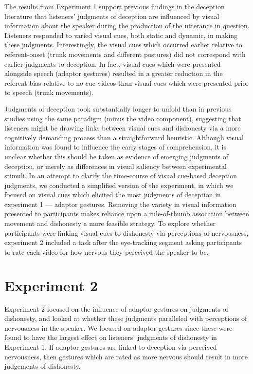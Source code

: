 \documentclass[a4paper,man,natbib]{apa6}
\begin{document}
The results from Experiment 1 support previous findings in the deception literature that listeners' judgments of deception are influenced by visual information about the speaker during the production of the utterance in question.
Listeners responded to varied visual cues, both static and dynamic, in making these judgments.
Interestingly, the visual cues which occurred earlier relative to referent-onset (trunk movements and different postures) did not correspond with earlier judgments to deception.
In fact, visual cues which were presented alongside speech (adaptor gestures) resulted in a greater reduction in the referent-bias relative to no-cue videos than visual cues which were presented prior to speech (trunk movements). 

Judgments of deception took substantially longer to unfold than in previous studies using the same paradigm (minus the video component), suggesting that listeners might be drawing links between visual cues and dishonesty via a more cognitively demanding process than a straightforward heuristic.
Although visual information was found to influence the early stages of comprehension, it is unclear whether this should be taken as evidence of emerging judgments of deception, or merely as differences in visual saliency between experimental stimuli.
In an attempt to clarify the time-course of visual cue-based deception judgments, we conducted a simplified version of the experiment, in which we focused on visual cues which elicited the most judgments of deception in experiment 1 --- adaptor gestures.
Removing the variety in visual information presented to participants makes reliance upon a rule-of-thumb assocation between movement and dishonesty a more feasible strategy.
To explore whether participants were linking visual cues to dishonesty via perceptions of nervousness, experiment 2 included a task after the eye-tracking segment asking participants to rate each video for how nervous they perceived the speaker to be. 

\section{Experiment 2}
Experiment 2 focused on the influence of adaptor gestures on judgments of dishonesty, and looked at whether these judgments paralleled with perceptions of nervousness in the speaker.
We focused on adaptor gestures since these were found to have the largest effect on listeners' judgments of dishonesty in Experiment 1. 
If adaptor gestures are linked to deception via perceived nervousness, then gestures which are rated as more nervous should result in more judgements of dishonesty. 
\end{document}
